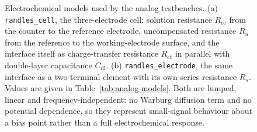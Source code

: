\begin{figure}[htbp]
{\begin{circuitikz}
\end{circuitikz}
  }
  \caption[{Electrochemical models used by the analog testbenches.}]{Electrochemical models used by the analog testbenches. (a) \texttt{randles\_cell}, the three-electrode cell: solution resistance \(R_{\mathrm{ce}}\) from the counter to the reference electrode, uncompensated resistance \(R_u\) from the reference to the working-electrode surface, and the interface itself as charge-transfer resistance \(R_{\mathrm{ct}}\) in parallel with double-layer capacitance \(C_{\mathrm{dl}}\). (b) \texttt{randles\_electrode}, the same interface as a two-terminal element with its own series resistance \(R_s\). Values are given in Table~\ref{tab:analog-models}. Both are lumped, linear and frequency-independent: no Warburg diffusion term and no potential dependence, so they represent small-signal behaviour about a bias point rather than a full electrochemical response.}
  \label{fig:analog-models}
\end{figure}
